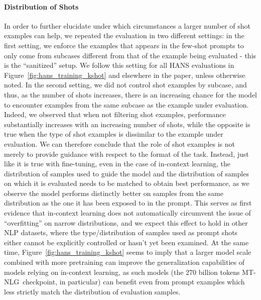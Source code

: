 \documentclass[11pt]{article}
\newcommand{\ours}{MT-NLG}
\begin{document}
\paragraph{Distribution of Shots} In order to further elucidate under which circumstances a larger number of shot examples can help, we repeated the evaluation in two different settings: in the first setting, we enforce the examples that appears in the few-shot prompts to only come from subcases different from that of the example being evaluated - this is the ``sanitized'' setup. We follow this setting for all HANS evaluations in Figure~\ref{fig:hans_training_kshot} and elsewhere in the paper, unless otherwise noted. In the second setting, we did not control shot examples by subcase, and thus, as the number of shots increases, there is an increasing chance for the model to encounter examples from the same subcase as the example under evaluation. Indeed, we observed that when not filtering shot examples, performance substantially increases with an increasing number of shots, while the opposite is true when the type of shot examples is dissimilar to the example under evaluation. We can therefore conclude that the role of shot examples is not merely to provide guidance with respect to the format of the task. Instead, just like it is true with fine-tuning, even in the case of in-context learning, the distribution of samples used to guide the model and the distribution of samples on which it is evaluated needs to be matched to obtain best performance, as we observe the model performs distinctly better on samples from the same distribution as the one it has been exposed to in the prompt. This serves as first evidence that in-context learning does not automatically circumvent the issue of ``overfitting'' on narrow distributions, and we expect this effect to hold in other NLP datasets, where the type/distribution of samples used as prompt shots either cannot be explicitly controlled or hasn't yet been examined. At the same time, Figure~\ref{fig:hans_training_kshot} seems to imply that a larger model scale combined with more pretraining can improve the generalization capabilities of models relying on in-context learning, as such models (the 270 billion tokens \ours~checkpoint, in particular) can benefit even from prompt examples which less strictly match the distribution of evaluation samples.
\end{document}
